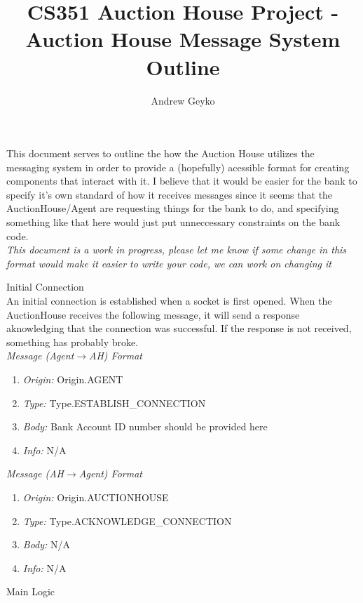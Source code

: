 \documentclass{article}
\title{CS351 Auction House Project - Auction House Message System Outline}
\author{Andrew Geyko}
\date{}
\begin{document}
\normalsize
\maketitle 
This document serves to outline the how the Auction House utilizes the messaging system in order to provide a (hopefully) acessible format for creating components that interact with it. I believe that it would be easier for the bank to specify it's own standard of how it receives messages since it seems that the AuctionHouse/Agent are requesting things for the bank to do, and specifying something like that here would just put unneccessary constraints on the bank code. 
\vspace{0.5cm}
\\\emph{This document is a work in progress, please let me know if some change in this format would make it easier to write your code, we can work on changing it}

\vspace{3cm} 

\huge 
Initial Connection 
\normalsize
\\An initial connection is established when a socket is first opened. When the AuctionHouse receives the following message, it will send a response aknowledging that the connection was successful. If the response is not received, something has probably broke.
\footnotesize 
\\\emph{Message (Agent$\to$AH) Format} 
\begin{enumerate}
	\item[]\emph{Origin:} Origin.AGENT
	\item[]\emph{Type: } Type.ESTABLISH\_CONNECTION 
	\item[]\emph{Body: } Bank Account ID number should be provided here  
	\item[]\emph{Info: } N/A 
\end{enumerate}
\emph{Message (AH$\to$Agent) Format} 
\begin{enumerate}
	\item[]\emph{Origin:} Origin.AUCTIONHOUSE 
	\item[]\emph{Type: } Type.ACKNOWLEDGE\_CONNECTION
	\item[]\emph{Body: } N/A 
	\item[]\emph{Info: } N/A 
\end{enumerate}
\clearpage
\huge
Main Logic 

\vspace{1cm}
\end{document}
